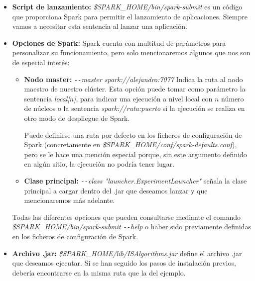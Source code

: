 \begin{itemize}
\item \textbf{Script de lanzamiento:} \textit{\$SPARK\_HOME/bin/spark-submit} es un código que proporciona Spark para permitir el lanzamiento de aplicaciones. Siempre vamos a necesitar esta sentencia al lanzar una aplicación.
\item \textbf{Opciones de Spark:} Spark cuenta con multitud de parámetros para personalizar su funcionamiento, pero solo mencionaremos algunos que nos son de especial interés:

\begin{itemize}

\item \textbf{Nodo master:} \textit{\texttt{-{}-}master spark://alejandro:7077} Indica la ruta al nodo maestro de nuestro clúster. Esta opción puede tomar como parámetro la sentencia \textit{local[$n$]}, para indicar una ejecución a nivel local con $n$ número de núcleos o la sentencia \textit{spark://ruta:puerto} si la ejecución se realiza en otro modo de despliegue de Spark.

Puede definirse una ruta por defecto en los ficheros de configuración de Spark (concretamente en \textit{\$SPARK\_HOME/conf/spark-defaults.conf}), pero se le hace una mención especial porque, sin este argumento definido en algún sitio, la ejecución no podría tener lugar.

\item \textbf{Clase principal:} \textit{\texttt{-{}-}class "launcher.ExperimentLauncher"} señala la clase principal a cargar dentro del .jar que deseamos lanzar y que mencionaremos más adelante.

\end{itemize}

Todas las diferentes opciones que pueden consultarse mediante el comando \textit{\$SPARK\_HOME/bin/spark-submit \texttt{-{}-}help} o haber sido previamente definidas en los ficheros de configuración de Spark.


\item \textbf{Archivo .jar:} \textit{\$SPARK\_HOME/lib/ISAlgorithms.jar} define el archivo .jar que deseamos ejecutar. Si se han seguido los pasos de instalación previos, debería encontrarse en la misma ruta que la del ejemplo.


\end{itemize}
